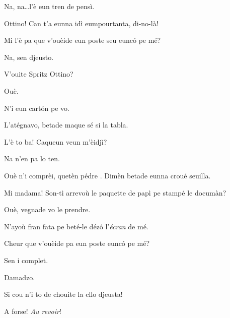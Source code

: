 \begin{drama}
\Tuenospeaks Na, na\ldots l'è eun tren de pensì.

\Richardspeaks Ottino! Can t'a eunna idì eumpourtanta, di-no-là!


\Corrierespeaks{} Mi l'è pa que v'ouèide eun poste seu eunc\'o pe mé?

\Richardspeaks Na, sen djeusto.

\Corrierespeaks{} V'ouite Spritz Ottino?

\Spritzspeaks Ouè.

\Corrierespeaks N'i eun cart\'on pe vo.

\Spritzspeaks L'atégnavo, betade maque sé si la tabla.



\Corrierespeaks{} L'è to ba! Caqueun veun m'èidjì?

\Tcheuttespeaks Na n'en pa lo ten.

\Corrierespeaks Ouè n'i comprèi, quetèn pédre \stufo.  Dimèn betade eunna croué seuilla.


\Richardspeaks{} Mi madama! Son-tì arrevoù le paquette de papì pe stampé le documàn?

\Corrierespeaks Ouè, vegnade vo le prendre.


\Richardspeaks N'ayoù fran fata pe beté-le déz\'o l'\textit{écran} de mé.


\Corrierespeaks{}  Cheur que v'ouèide pa eun poste eunc\'o pe mé?

\Saventaspeaks Sen i complet.

\Corrierespeaks Damadzo.

\Sandrinospeaks Si cou n'i to de chouite la cllo djeusta!


\Corrierespeaks A forse! \textit{Au revoir}!


\end{drama}
